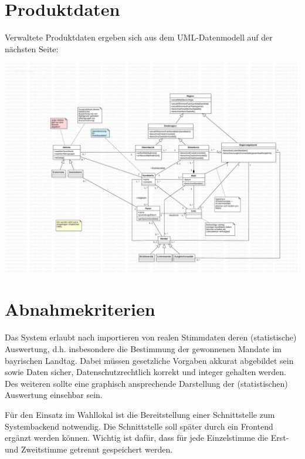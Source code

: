 \documentclass[a4paper,12pt]{article}
\begin{document}
\section{Produktdaten}
Verwaltete Produktdaten ergeben sich aus dem UML-Datenmodell auf der nächsten Seite:

\begin{center}
	\includegraphics[width=\textwidth]{../model.pdf}
\end{center}

\section{Abnahmekriterien}
Das System erlaubt nach importieren von realen Stimmdaten deren (statistische) Auswertung, d.h. 
insbesondere die Bestimmung der gewonnenen Mandate im bayrischen Landtag. Dabei müssen gesetzliche
Vorgaben akkurat abgebildet sein sowie Daten sicher, Datenschutzrechtlich korrekt und integer gehalten
werden. Des weiteren sollte eine graphisch ansprechende Darstellung der (statistischen) Auswertung
einsehbar sein. 

Für den Einsatz im Wahllokal ist die Bereitstellung einer Schnittstelle zum Systembackend notwendig. Die Schnittstelle soll später durch ein Frontend ergänzt werden können. Wichtig ist dafür, dass für jede Einzelstimme die Erst- und Zweitstimme getrennt gespeichert werden. 
\end{document}
